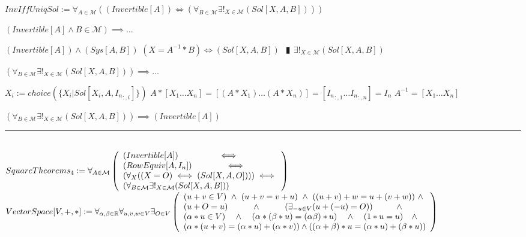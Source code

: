 \documentclass{book}
\newcommand{\abr}{:=}
\newcommand{\pipe}{$\phantom{(}\vrectangleblack\phantom{)}$}
\begin{document}
$InvIffUniqSol \abr \forall_{A \in \mathcal{M}}((Invertible[A]) \iff (\forall_{B \in \mathcal{M}} \exists!_{X \in \mathcal{M}}(Sol[X, A, B])))$
\begin{enumerate}
  \lit $(Invertible[A] \land B \in \mathcal{M}) \implies \ldots$
  \begin{enumerate}
    \lit $(Invertible[A]) \land (Sys[A, B])$
    \lit $(X = A^{-1} * B) \iff (Sol[X, A, B])$ \pipe $\exists!_{X \in \mathcal{M}}(Sol[X, A, B])$
  \end{enumerate}
  \lit $(\forall_{B \in \mathcal{M}} \exists!_{X \in \mathcal{M}}(Sol[X, A, B])) \implies \ldots$
  \begin{enumerate}
    \lit $X_i \abr choice(\{X_i | Sol[X_i, A, {I_n}_{:, i}]\})$
    \lit $A * [X_1 \ldots X_n] = [(A * X_1) \ldots (A * X_n)] =  [{I_n}_{:, 1} \ldots {I_n}_{:, n}] = I_n$ \lit $A^{-1} = [X_1 \ldots X_n]$
  \end{enumerate}
  \lit $(\forall_{B \in \mathcal{M}} \exists!_{X \in \mathcal{M}}(Sol[X, A, B])) \implies (Invertible[A])$
\end{enumerate} \vspace{.75mm} \hrule \vspace{.75mm} \ \\ 

$SquareTheorems_4 \abr \forall_{A \in \mathcal{M}}\left(\begin{array}{ll}
  (Invertible[A]) \hfill \iff \hfill \\
  (RowEquiv[A, I_n]) \hfill \iff \hfill \\
  (\forall_{X}((X = O) \iff (Sol[X, A, O]))) \hfill \iff \hfill \\
  (\forall_{B \in \mathcal{M}} \exists!_{X \in \mathcal{M}}(Sol[X, A, B]))
\end{array}\right)$ \\

$VectorSpace[V, +, *] \abr \forall_{\alpha ,\beta \in \mathbb{R}} \forall_{u, v, w \in V} \exists_{O \in V}\left(\begin{array}{ll}
  (u + v \in V) \hfill \land \hfill( u + v = v + u) \hfill \land \hfill ((u + v) + w = u + (v + w)) \hfill \land \hfill \\
  (u + O = u) \hfill \land \hfill (\exists_{-u \in V}(u + (-u) = O)) \hfill \land \hfill \\
  (\alpha * u \in V) \hfill \land \hfill (\alpha * (\beta * u) = (\alpha \beta) * u) \hfill \land \hfill (1 * u = u) \hfill \land \hfill \\
  (\alpha * (u + v) = (\alpha * u) + (\alpha * v))  \hfill \land \hfill ((\alpha + \beta) * u = (\alpha * u) + (\beta * u)) \\
\end{array}\right)$
\end{document}
